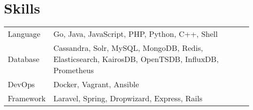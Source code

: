 \documentclass[11pt, letterpaper]{simple-cv}
\begin{document}
\section{Skills}
\begin{tabular}{ l l }
 Language &  Go, Java, JavaScript, PHP, Python, C++, Shell\\
 Database & Cassandra, Solr, MySQL, MongoDB, Redis, Elasticsearch, KairosDB, OpenTSDB, InfluxDB, Prometheus\\
 DevOps & Docker, Vagrant, Ansible\\
 Framework & Laravel, Spring, Dropwizard, Express, Rails
\end{tabular}



\end{document}
